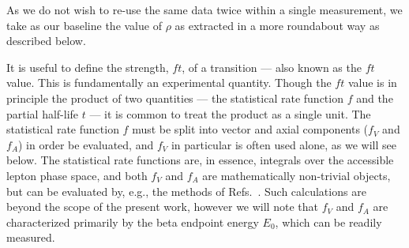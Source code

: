 As we do not wish to re-use the same data twice within a single measurement, we take as our baseline the value of $\rho$ as extracted in a more roundabout way as described below.


It is useful to define the strength, $ft$, of a transition --- also known as the $ft$ value.  This is fundamentally an experimental quantity.  Though the $ft$ value is in principle the product of two quantities --- the statistical rate function $f$ and the partial half-life $t$ --- it is common to treat the product as a single unit.  
%
The statistical rate function $f$ must be split into vector and axial components ($f_V$ and $f_A$) in order be evaluated, and $f_V$ in particular is often used alone, as we will see below.  The statistical rate functions are, in essence, integrals over the accessible lepton phase space, and both $f_V$ and $f_A$ are mathematically non-trivial objects\cite{towner_hardy_1995_frombook}\cite{HardyTowner2005_Superallowed}, but can be evaluated by, e.g., the methods of Refs.~\cite{wilkinson2}\cite{wilkinson3}\cite{wilkinson4}.  
Such calculations are beyond the scope of the present work, however we will note that 
$f_V$ and $f_A$ are characterized primarily by the beta endpoint energy $E_0$, which can be readily measured.  

